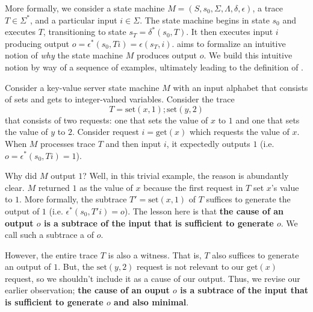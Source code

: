 More formally, we consider a state machine $M = (S, s_0, \Sigma, \Lambda,
\delta, \epsilon)$, a trace $T \in \Sigma^*$, and a particular input $i \in
\Sigma$. The state machine begins in state $s_0$ and executes $T$,
transitioning to state $s_T = \delta^*(s_0, T)$. It then executes input $i$
producing output $o = \epsilon^*(s_0, Ti) = \epsilon(s_T, i)$. \Watprovenance{}
aims to formalize an intuitive notion of \emph{why} the state machine $M$
produces output $o$. We build this intuitive notion by way of a sequence of
examples, ultimately leading to the definition of \watprovenance{}.

\begin{example}
  \newcommand{\kvset}{\text{set}}
  \newcommand{\kvget}{\text{get}}
  Consider a key-value server state machine $M$ with an input alphabet that
  consists of sets and gets to integer-valued variables. Consider the trace
  \[
    T = \kvset(x, 1); \kvset(y, 2)
  \]
  that consists of two requests: one that sets the value of $x$ to $1$ and one
  that sets the value of $y$ to $2$. Consider request $i = \kvget(x)$ which
  requests the value of $x$. When $M$ processes trace $T$ and then input $i$,
  it expectedly outputs $1$ (i.e.\ $o = \epsilon^*(s_0, Ti) = 1$).

  Why did $M$ output $1$? Well, in this trivial example, the reason is
  abundantly clear. $M$ returned $1$ as the value of $x$ because the first
  request in $T$ set $x$'s value to $1$. More formally, the subtrace $T' =
  \kvset(x, 1)$ of $T$ suffices to generate the output of $1$ (i.e.
  $\epsilon^*(s_0, T'i) = o$). The lesson here is that \textbf{the cause of an
  output $o$ is a subtrace of the input that is sufficient to generate $o$}. We
  call such a subtrace a  of $o$.

  However, the entire trace $T$ is also a witness. That is, $T$ also suffices
  to generate an output of $1$. But, the $\kvset(y, 2)$ request is not relevant
  to our $\kvget(x)$ request, so we shouldn't include it as a cause of our
  output. Thus, we revise our earlier observation; \textbf{the cause of an
  ouput $o$ is a subtrace of the input that is sufficient to generate $o$ and
  also minimal}.
\end{example}

